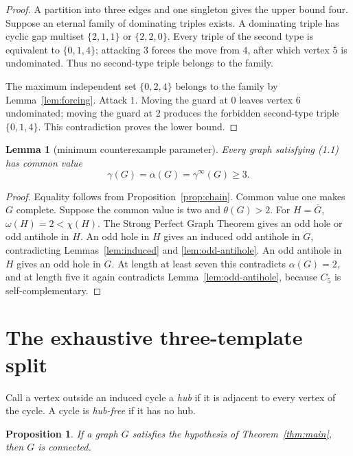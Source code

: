 \documentclass[11pt]{article}
\newtheorem{lemma}[theorem]{Lemma}
\newtheorem{proposition}[theorem]{Proposition}
\theoremstyle{definition}
\theoremstyle{remark}
\newcommand{\gaminf}{\gamma^{\infty}}
\begin{document}
\begin{proof}
A partition into three edges and one singleton gives the upper bound four.
Suppose an eternal family of dominating triples exists.  A dominating triple
has cyclic gap multiset \(\{2,1,1\}\) or \(\{2,2,0\}\).  Every triple of the
second type is equivalent to \(\{0,1,4\}\); attacking \(3\) forces the move
from \(4\), after which vertex \(5\) is undominated.  Thus no second-type
triple belongs to the family.

The maximum independent set \(\{0,2,4\}\) belongs to the family by
Lemma~\ref{lem:forcing}.  Attack \(1\).  Moving the guard at \(0\) leaves
vertex \(6\) undominated; moving the guard at \(2\) produces the forbidden
second-type triple \(\{0,1,4\}\).  This contradiction proves the lower
bound.
\end{proof}

\begin{lemma}[minimum counterexample parameter]\label{lem:min-k}
Every graph satisfying (1.1) has common value
\[
  \gamma(G)=\alpha(G)=\gaminf(G)\geq3.
\]
\end{lemma}

\begin{proof}
Equality follows from Proposition~\ref{prop:chain}.  Common value one makes
\(G\) complete.  Suppose the common value is two and
\(\theta(G)>2\).  For \(H=\overline G\),
\(\omega(H)=2<\chi(H)\).  The Strong Perfect Graph Theorem
\cite{ChudnovskyRobertsonSeymourThomas2006} gives an odd hole or odd
antihole in \(H\).  An odd hole in \(H\) gives an induced odd antihole in
\(G\), contradicting Lemmas~\ref{lem:induced} and
\ref{lem:odd-antihole}.  An odd antihole in \(H\) gives an odd hole in
\(G\).  At length at least seven this contradicts \(\alpha(G)=2\), and at
length five it again contradicts Lemma~\ref{lem:odd-antihole}, because
\(C_5\) is self-complementary.
\end{proof}

\section{The exhaustive three-template split}\label{sec:split}

Call a vertex outside an induced cycle a \emph{hub} if it is adjacent to
every vertex of the cycle.  A cycle is \emph{hub-free} if it has no hub.

\begin{proposition}\label{prop:connected}
If a graph \(G\) satisfies the hypothesis of Theorem~\ref{thm:main}, then
\(G\) is connected.
\end{proposition}
\end{document}
